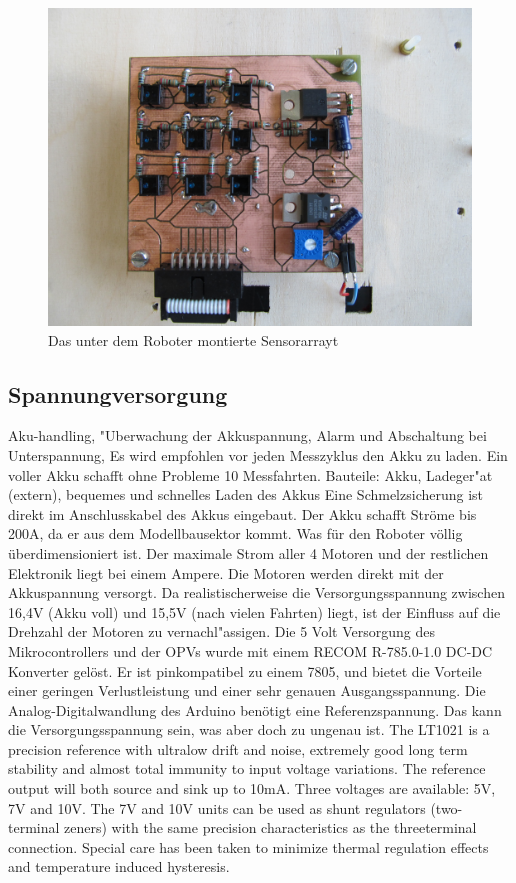 \documentclass[a4paper,bibtotoc,oneside]{scrbook}
\begin{document}
\begin{figure}[htbp]
\centering
\includegraphics[width=125mm]{img/sensor_array.jpg}
\caption{Das unter dem Roboter montierte Sensorarrayt}\label{array3}
\end{figure}



\subsection{Spannungversorgung}\thispagestyle{empty}
Aku-handling, "Uberwachung der Akkuspannung, Alarm und Abschaltung bei Unterspannung, 
Es wird empfohlen vor jeden Messzyklus den Akku zu laden. Ein voller Akku schafft ohne Probleme 10 Messfahrten. 
Bauteile: Akku, Ladeger"at (extern), bequemes und schnelles Laden des Akkus
Eine Schmelzsicherung ist direkt im Anschlusskabel des Akkus eingebaut. Der Akku schafft Ströme bis 200A, da er aus dem Modellbausektor kommt. Was für den Roboter völlig überdimensioniert ist. Der maximale Strom aller 4 Motoren und der restlichen Elektronik liegt bei einem Ampere. Die Motoren werden direkt mit der Akkuspannung versorgt. Da realistischerweise die Versorgungsspannung zwischen 16,4V (Akku voll) und 15,5V (nach vielen Fahrten) liegt, ist der Einfluss auf die Drehzahl der Motoren zu vernachl"assigen. 
Die 5 Volt Versorgung des Mikrocontrollers und der OPVs wurde mit einem RECOM R-785.0-1.0 DC-DC Konverter gelöst. Er ist pinkompatibel zu einem 7805, und bietet die Vorteile einer geringen Verlustleistung und einer sehr genauen Ausgangsspannung. 
Die Analog-Digitalwandlung des Arduino benötigt eine Referenzspannung. Das kann die Versorgungsspannung sein, was aber doch zu ungenau ist. 
The LT1021 is a precision reference with ultralow drift
and noise, extremely good long term stability and almost
total immunity to input voltage variations. The reference
output will both source and sink up to 10mA. Three
voltages are available: 5V, 7V and 10V. The 7V and 10V
units can be used as shunt regulators (two-terminal zeners)
with the same precision characteristics as the threeterminal
connection. Special care has been taken to minimize
thermal regulation effects and temperature
induced hysteresis.
\end{document}
